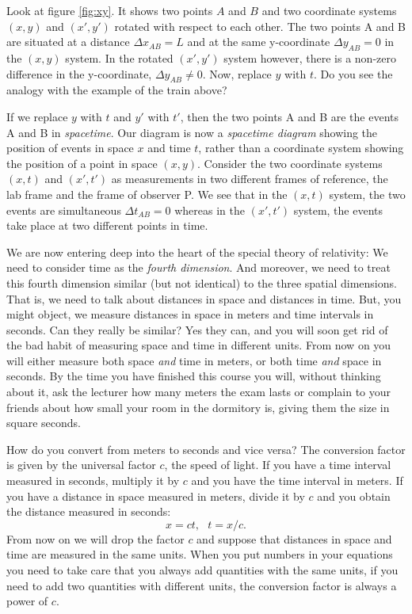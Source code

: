 {\begin{multicols}{2}
Look at figure \ref{fig:xy}. It shows two points $A$ and $B$ and two coordinate systems $(x,y)$ and $(x',y')$ rotated with respect to each other. The two points A and B are situated at a distance $\Delta x_{AB}=L$ and at the same y-coordinate $\Delta y_{AB}=0$ in the $(x,y)$ system. In the rotated $(x',y')$ system however, there is a non-zero difference in the y-coordinate, $\Delta y_{AB}\ne0$. Now, replace $y$ with $t$. Do you see the analogy with the example of the train above?

If we replace $y$ with $t$ and $y'$ with $t'$, then the two points A and B are the events A and B in {\it spacetime}. Our diagram is now a {\it spacetime diagram\label{pg:spacetimediag}} showing the position of events in space $x$ and time $t$, rather than a coordinate system showing the position of a point in space $(x,y)$. Consider the two coordinate systems $(x,t)$ and $(x',t')$ as measurements in two different frames of reference, the lab frame and the frame of observer P. We see that in the $(x,t)$ system, the two events are simultaneous $\Delta t_{AB}=0$ whereas in the $(x',t')$ system, the events take place at two different points in time.

We are now entering deep into the heart of the special theory of relativity: We need to consider time as the {\it fourth dimension}. And moreover, we need to treat this fourth dimension similar (but not identical) to the three spatial dimensions. That is, we need to talk about distances in space and distances in time. But, you might object, we measure distances in space in meters and time intervals in seconds. Can they really be similar? Yes they can, and you will soon get rid of the bad habit of measuring space and time in different units. From now on you will either measure both space \emph{and} time in meters, or both time \emph{and} space in seconds. By the time you have finished this course you will, without thinking about it, ask the lecturer how many meters the exam lasts or complain to your friends about how small your room in the dormitory is, giving them the size in square seconds.

How do you convert from meters to seconds and vice versa? The conversion factor is given by the universal factor $c$, the speed of light. If you have a time interval measured in seconds, multiply it by $c$ and you have the time interval in meters. If you have a distance in space measured in meters, divide it by $c$ and you obtain the distance measured in seconds:
\[
x=ct,\ \ \ t=x/c.
\]
From now on we will drop the factor $c$ and suppose that distances in space and time are measured in the same units. When you put numbers in your equations you need to take care that you always add quantities with the same units, if you need to add two quantities with different units, the conversion factor is always a power of $c$.


\end{multicols}}
